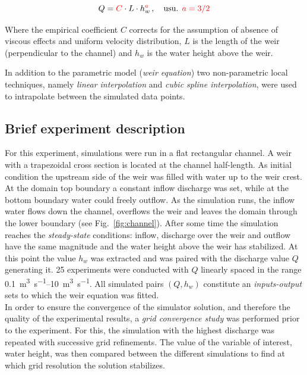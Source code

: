 \begin{equation}\label{eq:weir_eq}
  Q = \textcolor{red}{C} \cdot L \cdot h_w^{\textcolor{red}{a}}\, , \quad \mbox{usu. } \textcolor{red}{a = 3/2}
\end{equation}

\noindent Where the empirical coefficient $C$ corrects for the assumption of absence of viscous effects and uniform velocity distribution, $L$ is the length of the weir (perpendicular to the channel) and $h_w$ is the water height above the weir.

In addition to the parametric model (\textit{weir equation}) two non-parametric local techniques, namely \emph{linear interpolation} and \emph{cubic spline interpolation}, were used to intrapolate between the simulated data points.\\


\subsection{Brief experiment description}\label{sec:cs1_brief_description}

For this experiment, simulations were run in a flat rectangular channel.
A weir with a trapezoidal cross section is located at the channel half-length.
As initial condition the upstream side of the weir was filled with water up to the weir crest.
At the domain top boundary a constant inflow discharge was set, while at the bottom boundary water could freely outflow.
As the simulation runs, the inflow water flows down the channel, overflows the weir and leaves the domain through the lower boundary (see Fig.~\ref{fig:channel}).
After some time the simulation reaches the \emph{steady-state} conditions: inflow, discharge over the weir and outflow have the same magnitude and the water height above the weir has stabilized.
At this point the value $h_w$ was extracted and was paired with the discharge value $Q$ generating it.
\num{25} experiments were conducted with $Q$ linearly spaced in the range \SIrange{0.1}{10}{\cubic\meter\per\second}.
All simulated pairs $(Q, h_w)$ constitute an \emph{inputs-output} sets to which the weir equation was fitted.\\

In order to ensure the convergence of the simulator solution, and therefore the quality of the experimental results, a \emph{grid convergence study} was performed prior to the experiment.
For this, the simulation with the highest discharge was repeated with successive grid refinements.
The value of the variable of interest, water height, was then compared between the different simulations to find at which grid resolution the solution stabilizes.


